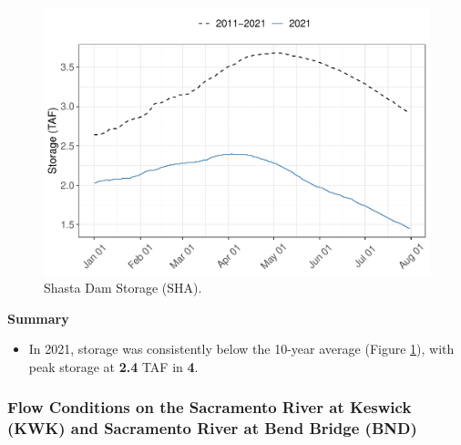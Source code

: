 \documentclass[
]{book}
\newenvironment{Shaded}{\begin{snugshade}}{\end{snugshade}}
\newcommand{\FunctionTok}[1]{\textcolor[rgb]{0.13,0.29,0.53}{\textbf{#1}}}
\newcommand{\NormalTok}[1]{#1}
\newcommand{\OtherTok}[1]{\textcolor[rgb]{0.56,0.35,0.01}{#1}}
\newcommand{\SpecialCharTok}[1]{\textcolor[rgb]{0.81,0.36,0.00}{\textbf{#1}}}
\newcommand{\StringTok}[1]{\textcolor[rgb]{0.31,0.60,0.02}{#1}}
\providecommand{\tightlist}{%
  \setlength{\itemsep}{0pt}\setlength{\parskip}{0pt}}
\theoremstyle{definition}
\theoremstyle{definition}
\theoremstyle{definition}
\theoremstyle{definition}
\theoremstyle{remark}
\begin{document}
\begin{figure}
\centering
\includegraphics{_main_files/figure-latex/SHAstor-fig-1.pdf}
\caption{\label{fig:SHAstor-fig}Shasta Dam Storage (SHA).}
\end{figure}

\begin{Shaded}
\end{Shaded}

\textbf{Summary}

\begin{itemize}
\tightlist
\item
  In 2021, storage was consistently below the 10-year average (Figure \ref{fig:SHAstor-fig}), with peak storage at \textbf{2.4} TAF in \textbf{4}.
\end{itemize}

\hypertarget{flow-conditions-on-the-sacramento-river-at-keswick-kwk-and-sacramento-river-at-bend-bridge-bnd}{%
\subsubsection{Flow Conditions on the Sacramento River at Keswick (KWK) and Sacramento River at Bend Bridge (BND)}\label{flow-conditions-on-the-sacramento-river-at-keswick-kwk-and-sacramento-river-at-bend-bridge-bnd}}
\end{document}
